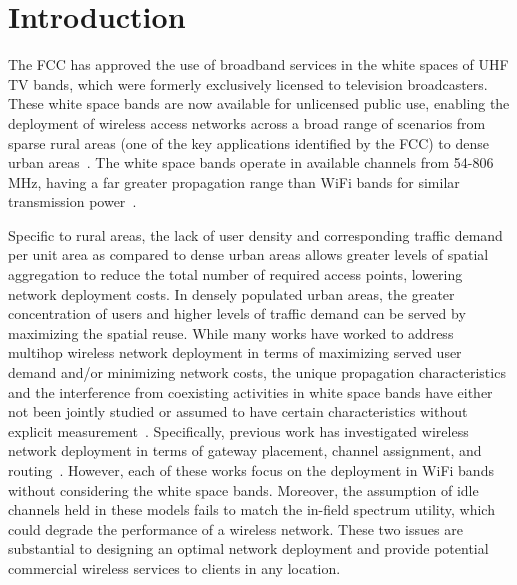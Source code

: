 \section{Introduction}
\label{sec:introduction}



The FCC has approved the use of broadband services in the white spaces of 
UHF TV bands, which were formerly exclusively licensed to television broadcasters.
These white space bands are now available for unlicensed public use, enabling the
deployment of wireless access networks across a broad range of scenarios from 
sparse rural areas (one of the key applications identified by the FCC) to dense urban 
areas~\cite{carlson}. The white space bands operate in available channels from 
54-806 MHz, having a far greater propagation range than WiFi bands for similar
transmission power~\cite{balanis2012antenna}. 

Specific to rural areas, the lack of user density and corresponding traffic
demand per unit area as compared to dense urban areas allows greater levels of
spatial aggregation to reduce the total number of required access points, lowering
network deployment costs. In densely populated urban areas, the greater concentration
of users and higher levels of traffic demand can be served by maximizing the spatial
reuse. 
While many works have worked to address multihop wireless network deployment
in terms of maximizing served user demand and/or minimizing network costs,
the unique propagation characteristics and the interference from coexisting
activities in white space bands have either not been jointly studied or assumed to 
have certain characteristics without explicit measurement~\cite{si2010overview}. 
Specifically, previous work has investigated wireless 
network deployment in terms of gateway placement, channel assignment, and 
routing~\cite{he2008optimizing,marina2010topology}.
However, each of these works focus on the deployment in WiFi bands without
considering the white space bands. Moreover, the assumption of idle channels
held in these models fails to match the in-field spectrum utility,
which could degrade the performance of a wireless network. These
two issues are substantial to designing an optimal network deployment and
provide potential commercial wireless services to clients in any location.

